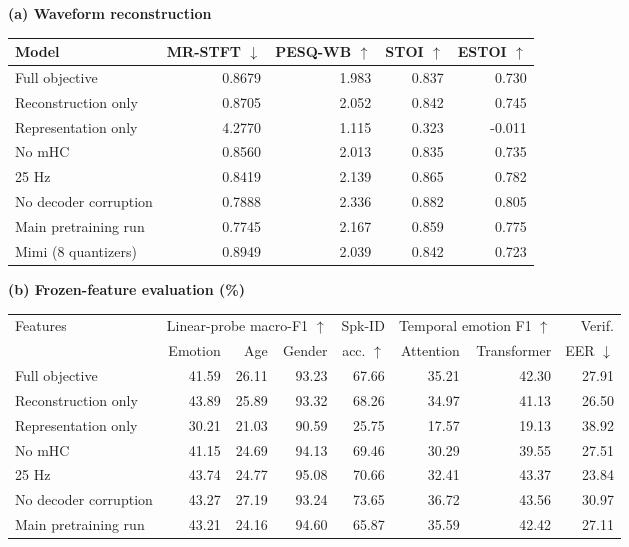 \documentclass[11pt,a4paper]{article}
\begin{document}
\begin{table}[t]
\centering
\footnotesize
\setlength{\tabcolsep}{3.5pt}
\textbf{(a) Waveform reconstruction}\par\smallskip
\begin{tabular}{@{}lrrrr@{}}
\toprule
Model & MR-STFT $\downarrow$ & PESQ-WB $\uparrow$ & STOI $\uparrow$ & ESTOI $\uparrow$ \\
\midrule
Full objective & 0.8679 & 1.983 & 0.837 & 0.730 \\
Reconstruction only & 0.8705 & 2.052 & 0.842 & 0.745 \\
Representation only & 4.2770 & 1.115 & 0.323 & -0.011 \\
No mHC & 0.8560 & 2.013 & 0.835 & 0.735 \\
25 Hz & 0.8419 & 2.139 & 0.865 & 0.782 \\
No decoder corruption & 0.7888 & 2.336 & 0.882 & 0.805 \\
\midrule
Main pretraining run & 0.7745 & 2.167 & 0.859 & 0.775 \\
\midrule
Mimi (8 quantizers) & 0.8949 & 2.039 & 0.842 & 0.723 \\
\bottomrule
\end{tabular}
\par\medskip
\textbf{(b) Frozen-feature evaluation (\%)}\par\smallskip
\begin{tabular}{@{}lrrrrrrr@{}}
\toprule
\multicolumn{1}{l}{Features} & \multicolumn{3}{c}{Linear-probe macro-F1 $\uparrow$} & Spk-ID & \multicolumn{2}{c}{Temporal emotion F1 $\uparrow$} & Verif. \\
\cmidrule(lr){2-4}\cmidrule(lr){6-7}
 & Emotion & Age & Gender & acc. $\uparrow$ & Attention & Transformer & EER $\downarrow$ \\
\midrule
Full objective & 41.59 & 26.11 & 93.23 & 67.66 & 35.21 & 42.30 & 27.91 \\
Reconstruction only & 43.89 & 25.89 & 93.32 & 68.26 & 34.97 & 41.13 & 26.50 \\
Representation only & 30.21 & 21.03 & 90.59 & 25.75 & 17.57 & 19.13 & 38.92 \\
No mHC & 41.15 & 24.69 & 94.13 & 69.46 & 30.29 & 39.55 & 27.51 \\
25 Hz & 43.74 & 24.77 & 95.08 & 70.66 & 32.41 & 43.37 & 23.84 \\
No decoder corruption & 43.27 & 27.19 & 93.24 & 73.65 & 36.72 & 43.56 & 30.97 \\
\midrule
Main pretraining run & 43.21 & 24.16 & 94.60 & 65.87 & 35.59 & 42.42 & 27.11 \\

\end{tabular}
\end{table}
\end{document}
